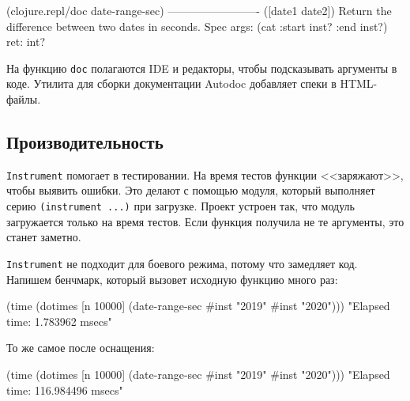 \begin{english}
  \begin{clojure}
(clojure.repl/doc date-range-sec)
-------------------------
([date1 date2])
  Return the difference between two dates in seconds.
Spec
  args: (cat :start inst? :end inst?)
  ret: int?
  \end{clojure}
\end{english}


На функцию \verb|doc| полагаются IDE и редакторы, чтобы подсказывать аргументы
в коде. Утилита для сборки документации Autodoc
добавляет спеки в HTML-файлы.

\subsection{Производительность}


\verb|Instrument| помогает в тестировании. На время тестов функции
<<заряжают>>, чтобы выявить ошибки. Это делают с помощью модуля, который
выполняет серию \verb|(instrument ...)| при загрузке. Проект устроен так, что
модуль загружается только на время тестов. Если функция получила не те
аргументы, это станет заметно.


\verb|Instrument| не подходит для боевого режима, потому что замедляет
код. Напишем бенчмарк, который вызовет исходную функцию много раз:


\begin{english}
  \begin{clojure}
(time
 (dotimes [n 10000]
   (date-range-sec #inst "2019" #inst "2020")))
"Elapsed time: 1.783962 msecs"
  \end{clojure}
\end{english}

\noindent
То же самое после оснащения:

\begin{english}
  \begin{clojure}
(time
 (dotimes [n 10000]
   (date-range-sec #inst "2019" #inst "2020")))
"Elapsed time: 116.984496 msecs"
  \end{clojure}
\end{english}


